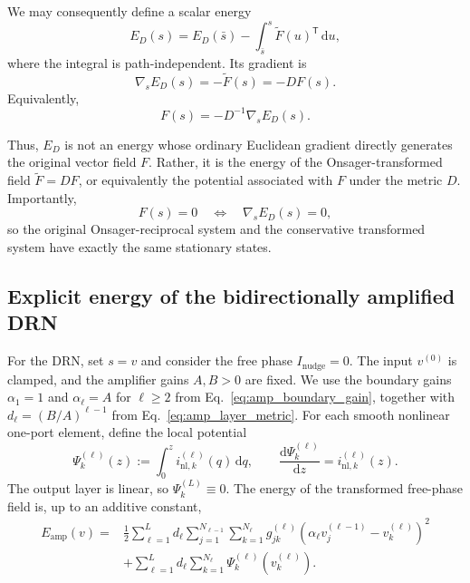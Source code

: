 \documentclass{article}
\begin{document}
We may consequently define a scalar energy
\begin{equation}
E_D(s)
=
E_D(\bar s)
-
\int_{\bar s}^{s}
\widetilde F(u)^{\mathsf T}\,\mathrm du,
\label{eq:supp_energy_path_integral}
\end{equation}
where the integral is path-independent. Its gradient is
\begin{equation}
\nabla_s E_D(s)
=
-\widetilde F(s)
=
-D F(s).
\label{eq:supp_energy_gradient}
\end{equation}
Equivalently,
\begin{equation}
F(s)
=
-D^{-1}\nabla_s E_D(s).
\label{eq:supp_energy_generalized_gradient}
\end{equation}

Thus, $E_D$ is not an energy whose ordinary Euclidean gradient directly
generates the original vector field $F$. Rather, it is the energy of the
Onsager-transformed field $\widetilde F=DF$, or equivalently the potential
associated with $F$ under the metric $D$. Importantly,
\begin{equation}
F(s)=0
\quad\Longleftrightarrow\quad
\nabla_s E_D(s)=0,
\end{equation}
so the original Onsager-reciprocal system and the conservative transformed
system have exactly the same stationary states.

\subsection{Explicit energy of the bidirectionally amplified DRN}

For the DRN, set $s=v$ and consider the free phase
$I_{\mathrm{nudge}}=0$. The input $v^{(0)}$ is clamped, and the amplifier
gains $A,B>0$ are fixed. We use the boundary gains
$\alpha_1=1$ and $\alpha_\ell=A$ for $\ell\geq2$ from
Eq.~\eqref{eq:amp_boundary_gain}, together with
$d_\ell=(B/A)^{\ell-1}$ from Eq.~\eqref{eq:amp_layer_metric}.
For each smooth nonlinear one-port element, define the local potential
\begin{equation}
\Psi_k^{(\ell)}(z)
:=\int_0^z i_{\mathrm{nl},k}^{(\ell)}(q)\,\mathrm dq,
\qquad
\frac{\mathrm d\Psi_k^{(\ell)}}{\mathrm dz}
=i_{\mathrm{nl},k}^{(\ell)}(z).
\label{eq:supp_energy_local_potential}
\end{equation}
The output layer is linear, so $\Psi_k^{(L)}\equiv0$.
The energy of the transformed free-phase field is, up to an additive
constant,
\begin{equation}
\begin{aligned}
E_{\mathrm{amp}}(v)
={}&\frac12\sum_{\ell=1}^{L}d_\ell
\sum_{j=1}^{N_{\ell-1}}\sum_{k=1}^{N_\ell}
g_{jk}^{(\ell)}
\left(\alpha_\ell v_j^{(\ell-1)}-v_k^{(\ell)}\right)^2
\\
&+\sum_{\ell=1}^{L}d_\ell
\sum_{k=1}^{N_\ell}\Psi_k^{(\ell)}\!\left(v_k^{(\ell)}\right).
\end{aligned}
\label{eq:supp_energy_explicit_drn}
\end{equation}
\end{document}
